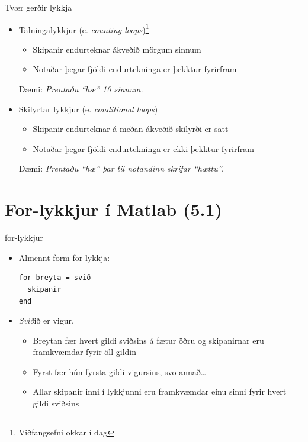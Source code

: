 \documentclass[handout]{beamer}
\begin{document}
\begin{frame}{Tvær gerðir lykkja}
\begin{itemize}
 \item Talningalykkjur (e. \emph{counting loops})\footnote{Viðfangsefni okkar í dag}
 \begin{itemize}
  \item Skipanir endurteknar ákveðið mörgum sinnum
  \item Notaðar þegar fjöldi endurtekninga er þekktur fyrirfram
 \end{itemize}
 Dæmi: \emph{Prentaðu ``hæ'' 10 sinnum.}
 \pause
 \item Skilyrtar lykkjur (e. \emph{conditional loops})
 \begin{itemize}
  \item Skipanir endurteknar á meðan ákveðið skilyrði er satt
  \item Notaðar þegar fjöldi endurtekninga er ekki þekktur fyrirfram
 \end{itemize}
 Dæmi: \emph{Prentaðu ``hæ'' þar til notandinn skrifar ``hættu''.}
\end{itemize}
\end{frame}

\section{For-lykkjur í Matlab (5.1)}

\begin{frame}[fragile]{for-lykkjur}
\begin{itemize}
 \item Almennt form for-lykkja:
\begin{verbatim}
for breyta = svið
  skipanir
end
\end{verbatim}
 \item \emph{Svið}ið er vigur. 
 \begin{itemize}
  \item Breytan fær hvert gildi sviðsins á fætur öðru og skipanirnar eru framkvæmdar fyrir öll gildin
  \item Fyrst fær hún fyrsta gildi vigursins, svo annað\ldots
  \item Allar skipanir inni í lykkjunni eru framkvæmdar einu sinni fyrir hvert gildi sviðsins
 \end{itemize}
\end{itemize}
\end{frame}
\end{document}
